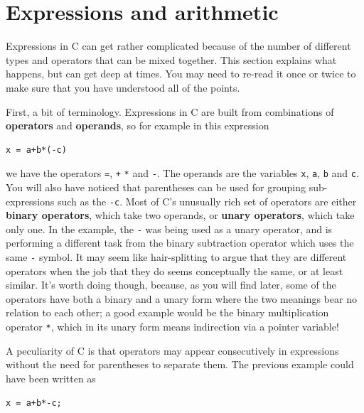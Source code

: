   

 
        \section{Expressions and arithmetic}\label{sec:exprArith}
        

  

  Expressions in C can get rather complicated because of the number of
   different types and operators that can be mixed together. This section
   explains what happens, but can get deep at times. You may need to re-read
   it once or twice to make sure that you have understood all of the
   points.


  First, a bit of terminology. Expressions in C are built from
   combinations of \textbf{operators} and \textbf{operands}, so for
   example in this expression


  \begin{Verbatim}
x = a+b*(-c)
\end{Verbatim}

  we have the operators \texttt{=}, \texttt{+} \texttt{*}
   and \texttt{-}. The operands are the
   variables \texttt{x}, \texttt{a}, \texttt{b}
   and \texttt{c}. You will also have noticed that parentheses can be
   used for grouping sub-expressions such as the \texttt{-c}. Most of
   C's unusually rich set of operators are either \textbf{binary operators},
   which take two operands, or \textbf{unary operators}, which take only
   one. In the example, the \texttt{-} was being used as a unary
   operator, and is performing a different task from the binary subtraction
   operator which uses the same \texttt{-} symbol. It may seem like
   hair-splitting to argue that they are different operators when the job that
   they do seems conceptually the same, or at least similar. It's worth doing
   though, because, as you will find later, some of the operators have both a
   binary and a unary form where the two meanings bear no relation to each
   other; a good example would be the binary multiplication
   operator \texttt{*}, which in its unary form means indirection via
   a pointer variable!


  A peculiarity of C is that operators may appear consecutively in
   expressions without the need for parentheses to separate them. The previous
   example could have been written as


  \begin{Verbatim}
x = a+b*-c;
\end{Verbatim}

